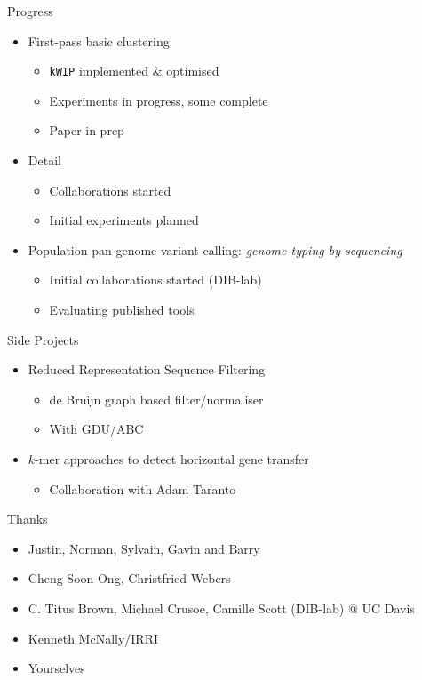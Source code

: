 \documentclass[t]{beamer}
\begin{document}
\begin{frame}{Progress}
  \begin{itemize}
    \item First-pass basic clustering
      \begin{itemize}
        \item \texttt{kWIP} implemented \& optimised
        \item Experiments in progress, some complete
        \item Paper in prep
      \end{itemize}
      \pause
    \item Detail
      \begin{itemize}
        \item Collaborations started
        \item Initial experiments planned
      \end{itemize}
      \pause
    \item Population pan-genome variant calling:
        \textit{genome-typing by sequencing}
        \begin{itemize}
          \item Initial collaborations started (DIB-lab)
          \item Evaluating published tools
        \end{itemize}
  \end{itemize}
\end{frame}

\begin{frame}{Side Projects}
  \begin{itemize}
    \item Reduced Representation Sequence Filtering
      \begin{itemize}
        \item de Bruijn graph based filter/normaliser
        \item With GDU/ABC
      \end{itemize}
    \item $k$-mer approaches to detect horizontal gene transfer
      \begin{itemize}
        \item Collaboration with Adam Taranto
      \end{itemize}
  \end{itemize}
\end{frame}

\begin{frame}{Thanks}
  \begin{itemize}
    \item Justin, Norman, Sylvain, Gavin and Barry
    \item Cheng Soon Ong, Christfried Webers
    \item C. Titus Brown, Michael Crusoe, Camille Scott (DIB-lab) @ UC Davis
    \item Kenneth McNally/IRRI
    \item Yourselves
  \end{itemize}
\end{frame}
\end{document}
